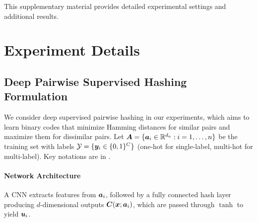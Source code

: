 % 


%   

This supplementary material provides detailed experimental settings and additional results.




\section{Experiment Details}
\label{Appendix: Experiment details} 
\subsection{Deep Pairwise Supervised Hashing Formulation}
\label{Appendix: hashing formulation}

We consider deep supervised pairwise hashing in our experiments, which aims to learn binary codes that minimize Hamming distances for similar pairs and maximize them for dissimilar pairs. Let $\bm{A} = \{\bm{a}_i \in \mathbb{R}^{d_a} : i = 1, \ldots, n\}$ be the training set with labels $\mathcal{Y} = \{\bm{y}_i \in \{0,1\}^C\}$ (one-hot for single-label, multi-hot for multi-label). Key notations are in .


\paragraph{Network Architecture}  
A CNN extracts features from $\bm{a}_i$, followed by a fully connected hash layer producing $d$-dimensional outputs $\bm{C}(\bm{x}; \bm{a}_i)$, which are passed through $\tanh$ to yield $\bm{u}_i$.



